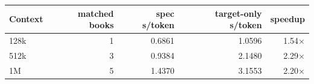 \begin{tabular}{lrrrr}
\toprule
Context & matched books & spec s/token & target-only s/token & speedup \\
\midrule
128k & 1 & 0.6861 & 1.0596 & 1.54$\times$ \\
512k & 3 & 0.9384 & 2.1480 & 2.29$\times$ \\
1M & 5 & 1.4370 & 3.1553 & 2.20$\times$ \\
\bottomrule
\end{tabular}
